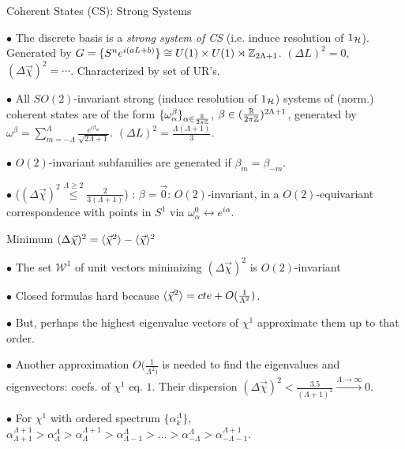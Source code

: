 \begin{frame}{Coherent States (CS): Strong Systems} %

    $\bullet$ The discrete basis is a \textit{strong system of CS} (i.e. induce resolution of $1_{\mathcal H}$). Generated by $G = \{S^n e^{i(aL + b)}\}\cong U(1)\times U(1) \rtimes \mathbb Z_{2\Lambda + 1}$. $(\Delta L)^2 = 0$, $(\Delta \vec \chi)^2 = \cdots$. Characterized by set of UR's.
    
    $\bullet$ All $SO(2)$-invariant strong (induce resolution of $1_\mathcal H$) systems of (norm.) coherent states are of the form $\{\omega^\beta_\alpha\}_{\alpha \in \frac{\mathbb R}{2\pi\mathbb Z}}$, $\beta \in (\frac{\mathbb R}{2\pi\mathbb Z})^{2\Lambda+1}$, generated by $\omega^\beta = \sum_{m = -\Lambda}^\Lambda \frac{e^{i\beta_m}}{\sqrt{2\Lambda+1}}$. $(\Delta L)^2 = \frac{\Lambda(\Lambda + 1)}{3}$.
    
    $\bullet$ $O(2)$-invariant subfamilies are generated if $\beta_m = \beta_{-m}$. 
    
    $\bullet$  ($(\Delta \vec \chi)^2 \overset{\Lambda \geq 2}{\leq } \frac{2}{3(\Lambda + 1)}$) :  $\beta = \vec 0$: $O(2)$-invariant, in a $O(2)$-equivariant correspondence with points in $S^1$ via $\omega^0_\alpha \leftrightarrow e^{i \alpha}$.
\end{frame}

\begin{frame}{Minimum $(\Delta \vec \chi)^2 = \langle \vec \chi^2 \rangle - \langle \vec \chi \rangle ^2$} %

    $\bullet$ The set $\mathcal W^1$ of unit vectors minimizing $(\Delta \vec \chi)^2$ is $O(2)$-invariant
    
    $\bullet$ Closed formulas hard because $\langle \vec \chi ^2 \rangle = cte + O(\frac{1}{\Lambda^2})$.
    
    $\bullet$ But, perhaps the highest eigenvalue vectors of $\chi^1$ approximate them up to that order.
    
    $\bullet$ Another approximation $O(\frac{1}{\Lambda^2)}$ is needed to find the eigenvalues and eigenvectors: coefs. of $\chi^1$ eq. $1$. Their dispersion $(\Delta \vec \chi)^2 < \frac{3.5}{(\Lambda+1)^2} \overset{\Lambda \to \infty}{\longrightarrow} 0$.
    
    $\bullet$ For $\chi^1$ with ordered spectrum $\{\alpha^\Lambda_k\}$, 
    $\alpha_{\Lambda+1}^{\Lambda+1} > \alpha_{\Lambda}^{\Lambda} > \alpha_\Lambda^{\Lambda+1} > \alpha_{\Lambda-1}^{\Lambda} > \dots > \alpha_{-\Lambda}^{\Lambda} > \alpha_{-\Lambda-1}^{\Lambda+1}$.
    
\end{frame}